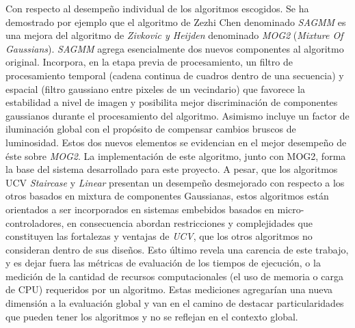 Con respecto al desempeño individual de los algoritmos escogidos. Se ha demostrado por ejemplo que el algoritmo de Zezhi Chen \cite{chen_vehicle_2012} denominado \textit{SAGMM} es una mejora del algoritmo de \textit{Zivkovic y Heijden} \cite{zivkovic_efficient_2006} denominado \textit{MOG2} (\textit{Mixture Of Gaussians}). \textit{SAGMM} agrega esencialmente dos nuevos componentes al algoritmo original. Incorpora, en la etapa previa de procesamiento, un filtro de procesamiento temporal (cadena continua de cuadros dentro de una secuencia) y espacial (filtro gaussiano entre pixeles de un vecindario) que favorece la estabilidad a nivel de imagen y posibilita mejor discriminación de componentes gaussianos durante el procesamiento del algoritmo. Asimismo incluye un factor de iluminación global con el propósito de compensar cambios bruscos de luminosidad. Estos dos nuevos elementos se evidencian en el mejor desempeño de éste sobre \textit{MOG2}. La implementación de este algoritmo, junto con MOG2,  forma la base del sistema desarrollado para este proyecto. A pesar, que los algoritmos UCV \textit{Staircase} y \textit{Linear} presentan un desempeño desmejorado con respecto a los otros basados en mixtura de componentes Gaussianas, estos algoritmos están orientados a ser incorporados en sistemas embebidos basados en micro-controladores, en consecuencia abordan restricciones y complejidades que constituyen las fortalezas y ventajas de \textit{UCV}, que los otros algoritmos no consideran dentro de sus diseños. Esto último revela una carencia de este trabajo, y es dejar fuera las métricas de evaluación de los tiempos de ejecución, o la medición de la cantidad de recursos computacionales (el uso de memoria o carga de CPU) requeridos por un algoritmo. Estas mediciones agregarían una nueva dimensión a la evaluación global y van en el camino de destacar particularidades que pueden tener los algoritmos y no se reflejan en el contexto global. 

